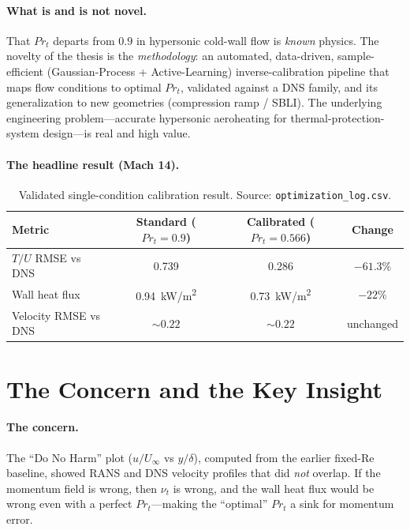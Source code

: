 \documentclass[11pt]{article}
\newcommand{\Prt}{\ensuremath{Pr_t}}
\begin{document}
\paragraph{What is and is not novel.}
That \Prt{} departs from $0.9$ in hypersonic cold-wall flow is \emph{known} physics.
The novelty of the thesis is the \emph{methodology}: an automated, data-driven,
sample-efficient (Gaussian-Process + Active-Learning) inverse-calibration pipeline that
maps flow conditions to optimal \Prt{}, validated against a DNS family, and its
generalization to new geometries (compression ramp / SBLI). The underlying engineering
problem---accurate hypersonic aeroheating for thermal-protection-system design---is real
and high value.

\paragraph{The headline result (Mach 14).}
\begin{table}[H]
\centering
\begin{tabular}{lccc}
\toprule
Metric & Standard ($\Prt=0.9$) & Calibrated ($\Prt=0.566$) & Change \\
\midrule
$T/U$ RMSE vs DNS      & 0.739 & 0.286 & $\mathbf{-61.3\%}$ \\
Wall heat flux         & \SI{0.94}{kW/m^2} & \SI{0.73}{kW/m^2} & $-22\%$ \\
Velocity RMSE vs DNS   & $\sim 0.22$ & $\sim 0.22$ & unchanged \\
\bottomrule
\end{tabular}
\caption{Validated single-condition calibration result. Source: \texttt{optimization\_log.csv}.}
\end{table}

\section{The Concern and the Key Insight}
\paragraph{The concern.}
The ``Do No Harm'' plot ($u/U_\infty$ vs $y/\delta$), computed from the earlier
fixed-Re baseline, showed RANS and DNS velocity profiles that did \emph{not} overlap.
If the momentum field is wrong, then $\nu_t$ is
wrong, and the wall heat flux would be wrong even with a perfect \Prt{}---making the
``optimal'' \Prt{} a sink for momentum error.
\end{document}
